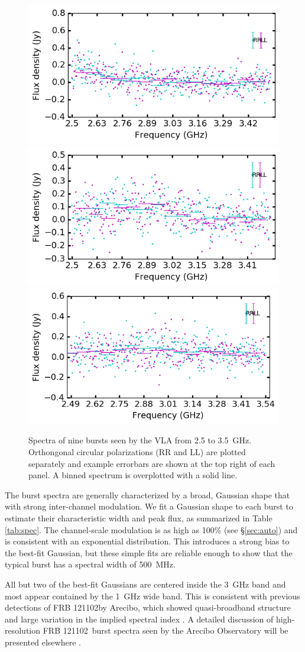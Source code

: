 \documentclass[twocolumn]{aastex61}
\newcommand{\frb}{FRB 121102}
\begin{document}
\begin{figure}[ht]
\begin{center}
 \begin{minipage}{2\columnwidth}
  \includegraphics[width=0.3\columnwidth]{spec_57646.png}
  \includegraphics[width=0.3\columnwidth]{spec_57648.png}
  \includegraphics[width=0.3\columnwidth]{spec_57649.png}
 \end{minipage}
\caption{Spectra of nine bursts seen by the VLA from 2.5 to 3.5~GHz. Orthongonal circular polarizations (RR and LL) are plotted separately and example errorbars are shown at the top right of each panel. A binned spectrum is overplotted with a solid line.
\label{fig:spec}}
\end{center}
\end{figure}

The burst spectra are generally characterized by a broad, Gaussian shape that with strong inter-channel modulation. We fit a Gaussian shape to each burst to estimate their characteristic width and peak flux, as summarized in Table \ref{tab:spec}. The channel-scale modulation is as high as 100\% (see \S \ref{sec:auto}) and is consistent with an exponential distribution. This introduces a strong bias to the best-fit Gaussian, but these simple fits are reliable enough to show that the typical burst has a spectral width of 500~MHz.

All but two of the best-fit Gaussians are centered inside the 3~GHz band and most appear contained by the 1~GHz wide band. This is consistent with previous detections of \frb by Arecibo, which showed quasi-broadband structure \citep{2016arXiv160308880S} and large variation in the implied spectral index \citep{2014ApJ...790..101S}. A detailed discussion of high-resolution \frb\ burst spectra seen by the Arecibo Observatory will be presented elsewhere \citep{WEIRD}.
\end{document}
